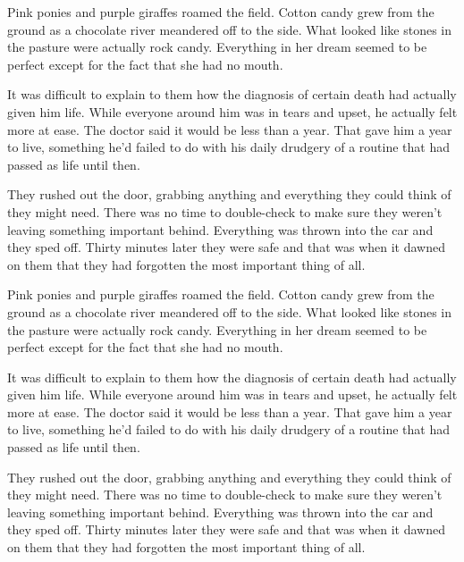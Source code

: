 \documentclass{GEWISDocument}
\begin{document}
Pink ponies and purple giraffes roamed the field. Cotton candy grew from the ground as a chocolate river meandered off to the side. What looked like stones in the pasture were actually rock candy. Everything in her dream seemed to be perfect except for the fact that she had no mouth.

It was difficult to explain to them how the diagnosis of certain death had actually given him life. While everyone around him was in tears and upset, he actually felt more at ease. The doctor said it would be less than a year. That gave him a year to live, something he'd failed to do with his daily drudgery of a routine that had passed as life until then.

They rushed out the door, grabbing anything and everything they could think of they might need. There was no time to double-check to make sure they weren't leaving something important behind. Everything was thrown into the car and they sped off. Thirty minutes later they were safe and that was when it dawned on them that they had forgotten the most important thing of all.

Pink ponies and purple giraffes roamed the field. Cotton candy grew from the ground as a chocolate river meandered off to the side. What looked like stones in the pasture were actually rock candy. Everything in her dream seemed to be perfect except for the fact that she had no mouth.

It was difficult to explain to them how the diagnosis of certain death had actually given him life. While everyone around him was in tears and upset, he actually felt more at ease. The doctor said it would be less than a year. That gave him a year to live, something he'd failed to do with his daily drudgery of a routine that had passed as life until then.

They rushed out the door, grabbing anything and everything they could think of they might need. There was no time to double-check to make sure they weren't leaving something important behind. Everything was thrown into the car and they sped off. Thirty minutes later they were safe and that was when it dawned on them that they had forgotten the most important thing of all.
\end{document}
